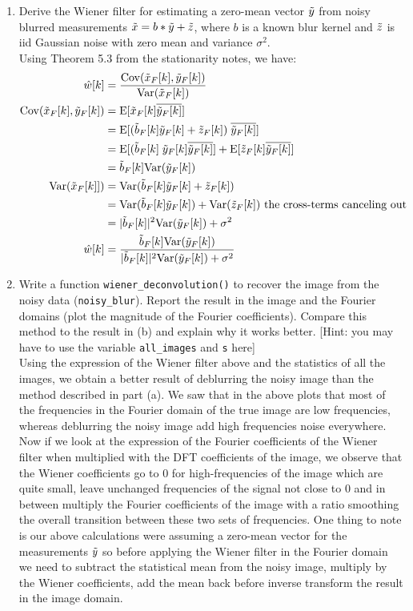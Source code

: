 \documentclass[12pt,twoside]{article}
\begin{document}
\begin{enumerate}
\begin{enumerate}
  \item Derive the Wiener filter for estimating a zero-mean vector $\tilde{  y }$ from noisy blurred measurements $\tilde{  x } = b \ast \tilde{  y } + \tilde{ z }$, where $b$ is a known blur kernel and $\tilde{ z }$ is iid Gaussian noise with zero mean and variance $\sigma^2$. \\
  Using Theorem 5.3 from the stationarity notes, we have:
  \begin{align*}
  	\hat{w}[k]					&= 	\frac{\mathrm{Cov}(\tilde{  x }_F[k], \tilde{  y }_F[k])} {\mathrm{Var}(\tilde{  x }_F[k])} \\
	\mathrm{Cov}(\tilde{  x }_F[k], \tilde{  y }_F[k])		&=	\mathrm{E}[\tilde{  x }_F[k] \overline{\tilde{  y }_F[k]}] \\
							&=	\mathrm{E}[(\tilde{  b }_F[k] \tilde{  y }_F[k] + \tilde{ z }_F[k]) \; \overline{\tilde{  y }_F[k]}] \\
							&=	\mathrm{E}[(\tilde{  b }_F[k] \; \tilde{  y }_F[k]  \overline{\tilde{  y }_F[k]} ] + \mathrm{E}[ \tilde{ z }_F[k]  \overline{\tilde{  y }_F[k]}] \\
							&=	\tilde{  b }_F[k]  \mathrm{Var}(\tilde{  y }_F[k]) \\
	\mathrm{Var}(\tilde{  x }_F[k]])				&=	\mathrm{Var}(\tilde{  b }_F[k] \tilde{  y }_F[k] + \tilde{ z }_F[k])	\\
							&= 	\mathrm{Var}(\tilde{  b }_F[k] \tilde{  y }_F[k]) + \mathrm{Var}(\tilde{ z }_F[k]) \text{ the cross-terms canceling out}\\
							&=	|\tilde{  b }_F[k]|^2 \mathrm{Var}(\tilde{  y }_F[k]) + \sigma^2	\\	
	\hat{w}[k]					&= 	\frac{\tilde{  b }_F[k]  \mathrm{Var}(\tilde{  y }_F[k])} {|\tilde{  b }_F[k]|^2 \mathrm{Var}(\tilde{  y }_F[k]) + \sigma^2}		
  \end{align*}
  
  
  \item Write a function \texttt{wiener\_deconvolution()} to recover the image from the noisy data (\texttt{noisy\_blur}). Report the result in the image and the Fourier domains (plot the magnitude of the Fourier coefficients). Compare this method to the result in (b) and explain why it works better. [Hint: you may have to use the variable \texttt{all\_images} and \texttt{s} here]\\
  Using the expression of the Wiener filter above and the statistics of all the images, we obtain a better result of deblurring the noisy image than the method described in part (a).
  We saw that in the above plots that most of the frequencies in the Fourier domain of  the true image are low frequencies, whereas deblurring the noisy image add high frequencies noise everywhere.
  Now if we look at the expression of the Fourier coefficients of the Wiener filter when multiplied with the DFT coefficients of the image, we observe that the Wiener coefficients go to $0$ for high-frequencies of the image which are quite small, leave unchanged frequencies of the signal not close to $0$ and in between multiply the Fourier coefficients of the image with a ratio smoothing the overall transition between these two sets of frequencies. One thing to note is our above calculations were assuming  a zero-mean vector for the measurements $\tilde{  y }$ so before applying the Wiener filter in the Fourier domain we need to subtract the statistical mean from the noisy image, multiply by the Wiener coefficients, add the mean back before inverse transform the result in the image domain.
  

\end{enumerate}
\end{enumerate}
\end{document}
